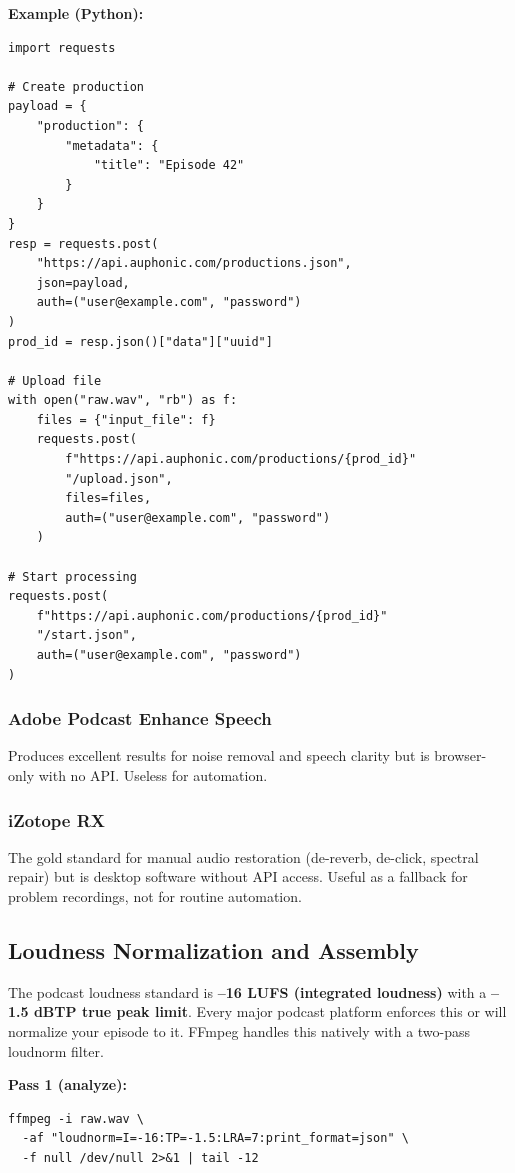 \documentclass[11pt,letterpaper]{article}
\begin{document}
\textbf{Example (Python):}

\begin{verbatim}
import requests

# Create production
payload = {
    "production": {
        "metadata": {
            "title": "Episode 42"
        }
    }
}
resp = requests.post(
    "https://api.auphonic.com/productions.json",
    json=payload,
    auth=("user@example.com", "password")
)
prod_id = resp.json()["data"]["uuid"]

# Upload file
with open("raw.wav", "rb") as f:
    files = {"input_file": f}
    requests.post(
        f"https://api.auphonic.com/productions/{prod_id}"
        "/upload.json",
        files=files,
        auth=("user@example.com", "password")
    )

# Start processing
requests.post(
    f"https://api.auphonic.com/productions/{prod_id}"
    "/start.json",
    auth=("user@example.com", "password")
)
\end{verbatim}

\subsubsection{Adobe Podcast Enhance Speech}

Produces excellent results for noise removal and speech clarity but is browser-only with no API. Useless for automation.

\subsubsection{iZotope RX}

The gold standard for manual audio restoration (de-reverb, de-click, spectral repair) but is desktop software without API access. Useful as a fallback for problem recordings, not for routine automation.

\subsection{Loudness Normalization and Assembly}

The podcast loudness standard is \textbf{–16 LUFS (integrated loudness)} with a \textbf{–1.5 dBTP true peak limit}. Every major podcast platform enforces this or will normalize your episode to it. FFmpeg handles this natively with a two-pass loudnorm filter.

\textbf{Pass 1 (analyze):}

\begin{verbatim}
ffmpeg -i raw.wav \
  -af "loudnorm=I=-16:TP=-1.5:LRA=7:print_format=json" \
  -f null /dev/null 2>&1 | tail -12
\end{verbatim}
\end{document}
